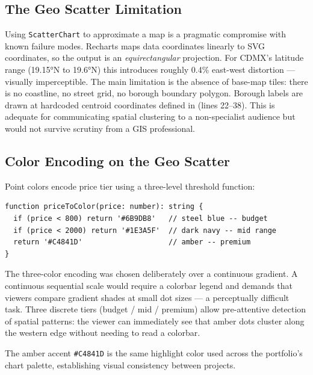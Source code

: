 \subsection{The Geo Scatter Limitation}

Using \texttt{ScatterChart} to approximate a map is a pragmatic compromise with
known failure modes. Recharts maps data coordinates linearly to SVG coordinates,
so the output is an \emph{equirectangular} projection. For CDMX's latitude range
(19.15°N to 19.6°N) this introduces roughly 0.4\% east-west distortion — visually
imperceptible. The main limitation is the absence of base-map tiles: there is no
coastline, no street grid, no borough boundary polygon. Borough labels are drawn
at hardcoded centroid coordinates defined in  (lines
22--38). This is adequate for communicating spatial clustering to a non-specialist
audience but would not survive scrutiny from a GIS professional.

\subsection{Color Encoding on the Geo Scatter}

Point colors encode price tier using a three-level threshold function:

\begin{lstlisting}[style=typescript, caption={\filepath{src/components/charts/GeoScatter.tsx} (lines 47--51)}]
function priceToColor(price: number): string {
  if (price < 800) return '#6B9DB8'   // steel blue -- budget
  if (price < 2000) return '#1E3A5F'  // dark navy -- mid range
  return '#C4841D'                    // amber -- premium
}
\end{lstlisting}

The three-color encoding was chosen deliberately over a continuous gradient. A
continuous sequential scale would require a colorbar legend and demands that viewers
compare gradient shades at small dot sizes — a perceptually difficult task. Three
discrete tiers (budget / mid / premium) allow pre-attentive detection of spatial
patterns: the viewer can immediately see that amber dots cluster along the western
edge without needing to read a colorbar.

The amber accent \texttt{\#C4841D} is the same highlight color used across the
portfolio's chart palette, establishing visual consistency between projects.

